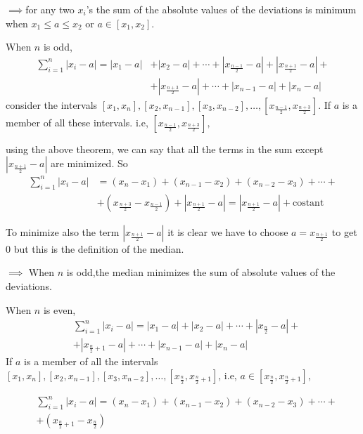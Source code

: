 \documentclass[12pt, letterpaper]{article}
\theoremstyle{definition}
\begin{document}
$\implies$for any two $x_i$'s the sum of the absolute values of the deviations is minimum when $x_1\leq a\leq x_2$ or $a\in[x_1,x_2]$.

When $n$ is odd,
\begin{equation}
\begin{aligned}
\sum_{i=1}^n\left|x_i-a\right|=\left|x_1-a\right|&+\left|x_2-a\right|+\cdots+\left|x_{\tfrac{n-1}{2}}-a\right| + \left|x_{\tfrac{n+1}{2}}-a\right|+\\
&+ \left|x_{\tfrac{n+3}{2}}-a\right|+ \cdots+\left|x_{n-1}-a\right|+\left|x_n-a\right|
\end{aligned}
\end{equation}
consider the intervals $[x_1,x_n], [x_2,x_{n-1}], [x_3,x_{n-2}], \ldots, \left[x_{\tfrac{n-1}{2}}, x_{\tfrac{n+3}{2}}\right]$. If $a$ is a member of all these intervals. i.e, $\left[x_{\tfrac{n-1}{2}},x_{\tfrac{n+3}{2}}\right],$

using the above theorem, we can say that all the terms in the sum except $\left|x_{\tfrac{n+1}{2}}-a\right|$ are minimized. So
\begin{equation}
\begin{aligned}
\sum_{i=1}^n|x_i-a|&=(x_n-x_1)+(x_{n-1}-x_2)+(x_{n-2}-x_3)+\cdots +\\
& +\left(x_{\tfrac{n+3}{2}}-x_{\tfrac{n-1}{2}}\right) + \left|x_{\tfrac{n+1}{2}}-a\right| = \left|x_{\tfrac{n+1}{2}}-a \right|+\text{costant}
\end{aligned}
\end{equation}

To minimize also the term $\left|x_{\tfrac{n+1}{2}}-a \right|$ it is clear we have to choose $a=x_{\tfrac{n+1}{2}}$ to get $0$ but this is the definition of the median.

$\implies$ When $n$ is odd,the median minimizes the sum of absolute values of the deviations.

When $n$ is even,
\begin{equation}
\begin{aligned}
&\sum_{i=1}^n|x_i-a|=|x_1-a|+|x_2-a|+\cdots+|x_{\tfrac{n}{2}}-a|+\\
&+|x_{\tfrac{n}{2}+1}-a|+ \cdots+|x_{n-1}-a|+|x_n-a|
\end{aligned}
\end{equation}
If $a$ is a member of all the intervals $[x_1,x_n], [x_2,x_{n-1}], [x_3,x_{n-2}], \ldots, \left[x_{\tfrac{n}{2}},x_{\tfrac{n}{2}+1}\right]$, i.e, $a\in\left[x_{\tfrac{n}{2}},x_{\tfrac{n}{2}+1}\right]$,

\begin{equation}
\begin{aligned}
&\sum_{i=1}^n|x_i-a|=(x_n-x_1)+(x_{n-1}-x_2)+(x_{n-2}-x_3)+\cdots + \\
&+\left(x_{\tfrac{n}{2}+1}-x_{\tfrac{n}{2}}\right)
\end{aligned}
\end{equation}
\end{document}

